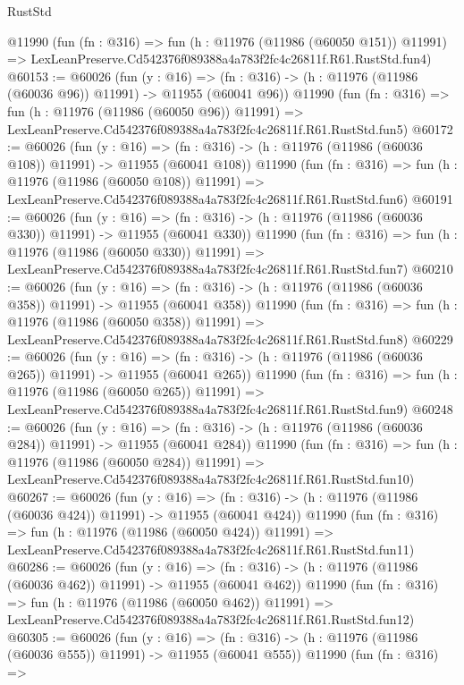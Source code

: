 \begin{lexlean}{RustStd}
\begin{coremodule}
    @11990
    (fun (fn : @316) =>
    fun (h : @11976 (@11986 (@60050 @151)) @11991) =>
    LexLeanPreserve.Cd542376f089388a4a783f2fc4c26811f.R61.RustStd.fun4)
@60153 := @60026
    (fun (y : @16) =>
    (fn : @316) -> (h : @11976 (@11986 (@60036 @96)) @11991) -> @11955 (@60041 @96))
    @11990
    (fun (fn : @316) =>
    fun (h : @11976 (@11986 (@60050 @96)) @11991) =>
    LexLeanPreserve.Cd542376f089388a4a783f2fc4c26811f.R61.RustStd.fun5)
@60172 := @60026
    (fun (y : @16) =>
    (fn : @316) -> (h : @11976 (@11986 (@60036 @108)) @11991) -> @11955 (@60041 @108))
    @11990
    (fun (fn : @316) =>
    fun (h : @11976 (@11986 (@60050 @108)) @11991) =>
    LexLeanPreserve.Cd542376f089388a4a783f2fc4c26811f.R61.RustStd.fun6)
@60191 := @60026
    (fun (y : @16) =>
    (fn : @316) -> (h : @11976 (@11986 (@60036 @330)) @11991) -> @11955 (@60041 @330))
    @11990
    (fun (fn : @316) =>
    fun (h : @11976 (@11986 (@60050 @330)) @11991) =>
    LexLeanPreserve.Cd542376f089388a4a783f2fc4c26811f.R61.RustStd.fun7)
@60210 := @60026
    (fun (y : @16) =>
    (fn : @316) -> (h : @11976 (@11986 (@60036 @358)) @11991) -> @11955 (@60041 @358))
    @11990
    (fun (fn : @316) =>
    fun (h : @11976 (@11986 (@60050 @358)) @11991) =>
    LexLeanPreserve.Cd542376f089388a4a783f2fc4c26811f.R61.RustStd.fun8)
@60229 := @60026
    (fun (y : @16) =>
    (fn : @316) -> (h : @11976 (@11986 (@60036 @265)) @11991) -> @11955 (@60041 @265))
    @11990
    (fun (fn : @316) =>
    fun (h : @11976 (@11986 (@60050 @265)) @11991) =>
    LexLeanPreserve.Cd542376f089388a4a783f2fc4c26811f.R61.RustStd.fun9)
@60248 := @60026
    (fun (y : @16) =>
    (fn : @316) -> (h : @11976 (@11986 (@60036 @284)) @11991) -> @11955 (@60041 @284))
    @11990
    (fun (fn : @316) =>
    fun (h : @11976 (@11986 (@60050 @284)) @11991) =>
    LexLeanPreserve.Cd542376f089388a4a783f2fc4c26811f.R61.RustStd.fun10)
@60267 := @60026
    (fun (y : @16) =>
    (fn : @316) -> (h : @11976 (@11986 (@60036 @424)) @11991) -> @11955 (@60041 @424))
    @11990
    (fun (fn : @316) =>
    fun (h : @11976 (@11986 (@60050 @424)) @11991) =>
    LexLeanPreserve.Cd542376f089388a4a783f2fc4c26811f.R61.RustStd.fun11)
@60286 := @60026
    (fun (y : @16) =>
    (fn : @316) -> (h : @11976 (@11986 (@60036 @462)) @11991) -> @11955 (@60041 @462))
    @11990
    (fun (fn : @316) =>
    fun (h : @11976 (@11986 (@60050 @462)) @11991) =>
    LexLeanPreserve.Cd542376f089388a4a783f2fc4c26811f.R61.RustStd.fun12)
@60305 := @60026
    (fun (y : @16) =>
    (fn : @316) -> (h : @11976 (@11986 (@60036 @555)) @11991) -> @11955 (@60041 @555))
    @11990
    (fun (fn : @316) =>

\end{coremodule}
\end{lexlean}
